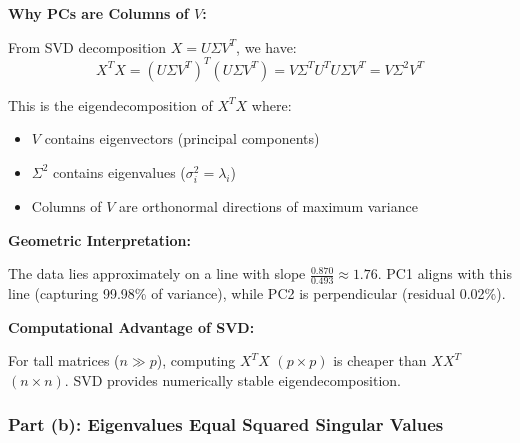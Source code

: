 \documentclass[12pt]{article}
\begin{document}
\begin{explanation}

\textbf{Why PCs are Columns of $V$:}

From SVD decomposition $X = U\Sigma V^T$, we have:
\[
X^T X = (U\Sigma V^T)^T (U\Sigma V^T) = V\Sigma^T U^T U \Sigma V^T = V\Sigma^2 V^T
\]

This is the eigendecomposition of $X^T X$ where:
\begin{itemize}
    \item $V$ contains eigenvectors (principal components)
    \item $\Sigma^2$ contains eigenvalues ($\sigma_i^2 = \lambda_i$)
    \item Columns of $V$ are orthonormal directions of maximum variance
\end{itemize}

\textbf{Geometric Interpretation:}

The data lies approximately on a line with slope $\frac{0.870}{0.493} \approx 1.76$. PC1 aligns with this line (capturing 99.98\% of variance), while PC2 is perpendicular (residual 0.02\%).

\textbf{Computational Advantage of SVD:}

For tall matrices ($n \gg p$), computing $X^T X$ $(p \times p)$ is cheaper than $XX^T$ $(n \times n)$. SVD provides numerically stable eigendecomposition.

\end{explanation}

\subsubsection{Part (b): Eigenvalues Equal Squared Singular Values}
\end{document}
